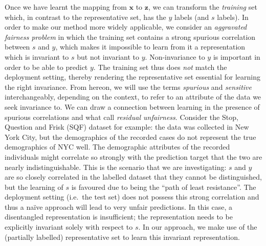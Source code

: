 Once we have learnt the mapping from $\bm{x}$ to $\bm{z}$, we can transform the \emph{training} set
which, in contrast to the representative set, has the $y$ labels (and $s$ labels). In order to make
our method more widely applicable, we consider an \emph{aggravated fairness problem}
in which the training set contains a strong spurious correlation between $s$ and $y$, which makes
it impossible to learn from it a representation which is invariant to $s$ but not invariant to $y$.
Non-invariance to $y$ is important in order to be able to predict $y$. The training set thus does
\emph{not} match the deployment setting, thereby rendering the representative set essential for
learning the right invariance.
From hereon, we will use the terms \emph{spurious} and \emph{sensitive} interchangeably, depending
on the context, to refer to an attribute of the data we seek invariance to.
We can draw a connection between learning in the presence of spurious correlations and what
\citet{kallus2018residual} call \emph{residual unfairness}. Consider the Stop, Question and Frisk
(SQF) dataset for example: the data was collected in New York City, but the demographics of the
recorded cases do not represent the true demographics of NYC well. The demographic attributes of
the recorded individuals might correlate so strongly with the prediction target that the two are
nearly indistinguishable. This is the scenario that we are investigating: $s$ and $y$ are so
closely correlated in the labelled dataset that they cannot be distinguished, but the learning of
$s$ is favoured due to being the ``path of least resistance''. The deployment setting (i.e.\ the
test set) does not possess this strong correlation and thus a na\"ive approach will lead to very
unfair predictions. In this case, a disentangled representation is insufficient; the representation
needs to be explicitly invariant solely with respect to $s$. In our approach, we make use of the
(partially labelled) representative set to learn this invariant representation.

